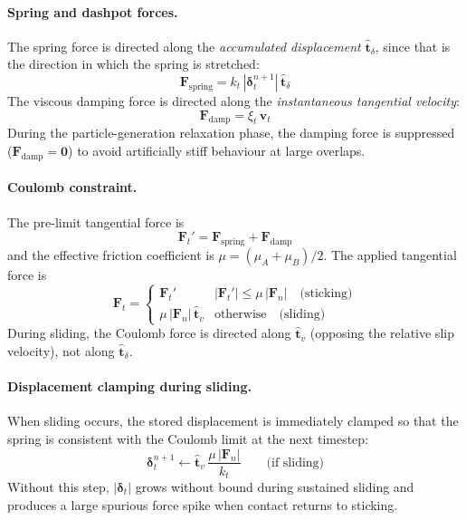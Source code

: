 \documentclass[12pt]{article}
\newcommand{\bs}[1]{\boldsymbol{#1}}
\begin{document}
\paragraph{Spring and dashpot forces.}
The spring force is directed along the \emph{accumulated displacement}
$\hat{\bs{t}}_\delta$, since that is the direction in which the spring is
stretched:
\begin{equation}
  \bs{F}_\text{spring} = k_t\,|\bs{\delta}_t^{n+1}|\,\hat{\bs{t}}_\delta
\end{equation}
The viscous damping force is directed along the \emph{instantaneous tangential
velocity}:
\begin{equation}
  \bs{F}_\text{damp} = \xi_t\,\bs{v}_t
\end{equation}
During the particle-generation relaxation phase, the damping force is
suppressed ($\bs{F}_\text{damp} = \bs{0}$) to avoid artificially stiff
behaviour at large overlaps.

\paragraph{Coulomb constraint.}
The pre-limit tangential force is
\begin{equation}
  \bs{F}_t' = \bs{F}_\text{spring} + \bs{F}_\text{damp}
\end{equation}
and the effective friction coefficient is $\mu = (\mu_A + \mu_B)/2$.
The applied tangential force is
\begin{equation}
  \bs{F}_t = \begin{cases}
    \bs{F}_t'
      & |\bs{F}_t'| \le \mu\,|\bs{F}_n| \quad \text{(sticking)} \\[4pt]
    \mu\,|\bs{F}_n|\,\hat{\bs{t}}_v
      & \text{otherwise} \quad \text{(sliding)}
  \end{cases}
\end{equation}
During sliding, the Coulomb force is directed along $\hat{\bs{t}}_v$
(opposing the relative slip velocity), not along $\hat{\bs{t}}_\delta$.

\paragraph{Displacement clamping during sliding.}
When sliding occurs, the stored displacement is immediately clamped so that
the spring is consistent with the Coulomb limit at the next timestep:
\begin{equation}
  \bs{\delta}_t^{n+1} \leftarrow
    \hat{\bs{t}}_v\,\frac{\mu\,|\bs{F}_n|}{k_t}
  \qquad \text{(if sliding)}
\end{equation}
Without this step, $|\bs{\delta}_t|$ grows without bound during sustained
sliding and produces a large spurious force spike when contact returns to
sticking.
\end{document}
